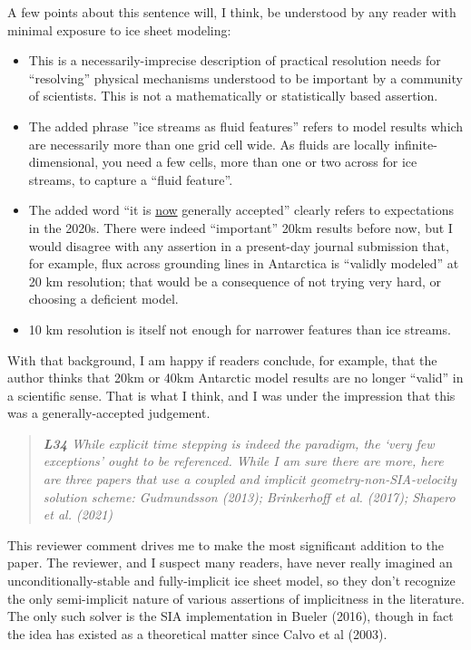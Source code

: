 \documentclass[letterpaper,final,12pt,reqno]{amsart}
\newenvironment{review}%
{\bigskip \par \begin{quote} \selectfont \sl}%
{\end{quote}}
\begin{document}
\noindent A few points about this sentence will, I think, be understood by any reader with minimal exposure to ice sheet modeling:
\begin{itemize}
\item This is a necessarily-imprecise description of practical resolution needs for ``resolving'' physical mechanisms understood to be important by a community of scientists.  This is not a mathematically or statistically based assertion.
\item The added phrase ''ice streams as fluid features'' refers to model results which are necessarily more than one grid cell wide.  As fluids are locally infinite-dimensional, you need a few cells, more than one or two across for ice streams, to capture a ``fluid feature''.
\item The added word ``it is \underline{now} generally accepted'' clearly refers to expectations in the 2020s.  There were indeed ``important'' 20km results before now, but I would disagree with any assertion in a present-day journal submission that, for example, flux across grounding lines in Antarctica is ``validly modeled'' at 20 km resolution; that would be a consequence of not trying very hard, or choosing a deficient model.
\item 10 km resolution is itself not enough for narrower features than ice streams.
\end{itemize}
With that background, I am happy if readers conclude, for example, that the author thinks that 20km or 40km Antarctic model results are no longer ``valid'' in a scientific sense.  That is what I think, and I was under the impression that this was a generally-accepted judgement.

\begin{review}
\textbf{L34}  While explicit time stepping is indeed the paradigm, the ‘very few exceptions’ ought to be referenced.  While I am sure there are more, here are three papers that use a coupled and implicit geometry-non-SIA-velocity solution scheme: Gudmundsson (2013); Brinkerhoff et al. (2017); Shapero et al. (2021)
\end{review}

\noindent This reviewer comment drives me to make the most significant addition to the paper.  The reviewer, and I suspect many readers, have never really imagined an unconditionally-stable and fully-implicit ice sheet model, so they don't recognize the only semi-implicit nature of various assertions of implicitness in the literature.  The only such solver is the SIA implementation in Bueler (2016), though in fact the idea has existed as a theoretical matter since Calvo et al (2003).
\end{document}
